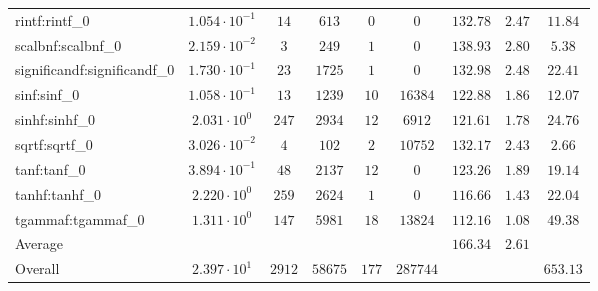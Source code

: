 \begin{tabular}{|l|c|c|c|c|c|c|c|c|}
rintf:rintf\_0               & $ 1.054 \cdot 10^{-1} $ & $ 14     $ & $ 613   $ & $ 0   $ & $ 0      $ & $ 132.78      $ & $ 2.47    $ & $ 11.84   $ \\
scalbnf:scalbnf\_0           & $ 2.159 \cdot 10^{-2} $ & $ 3      $ & $ 249   $ & $ 1   $ & $ 0      $ & $ 138.93      $ & $ 2.80    $ & $ 5.38    $ \\
significandf:significandf\_0 & $ 1.730 \cdot 10^{-1} $ & $ 23     $ & $ 1725  $ & $ 1   $ & $ 0      $ & $ 132.98      $ & $ 2.48    $ & $ 22.41   $ \\
sinf:sinf\_0                 & $ 1.058 \cdot 10^{-1} $ & $ 13     $ & $ 1239  $ & $ 10  $ & $ 16384  $ & $ 122.88      $ & $ 1.86    $ & $ 12.07   $ \\
sinhf:sinhf\_0               & $ 2.031 \cdot 10^{0}  $ & $ 247    $ & $ 2934  $ & $ 12  $ & $ 6912   $ & $ 121.61      $ & $ 1.78    $ & $ 24.76   $ \\
sqrtf:sqrtf\_0               & $ 3.026 \cdot 10^{-2} $ & $ 4      $ & $ 102   $ & $ 2   $ & $ 10752  $ & $ 132.17      $ & $ 2.43    $ & $ 2.66    $ \\
tanf:tanf\_0                 & $ 3.894 \cdot 10^{-1} $ & $ 48     $ & $ 2137  $ & $ 12  $ & $ 0      $ & $ 123.26      $ & $ 1.89    $ & $ 19.14   $ \\
tanhf:tanhf\_0               & $ 2.220 \cdot 10^{0}  $ & $ 259    $ & $ 2624  $ & $ 1   $ & $ 0      $ & $ 116.66      $ & $ 1.43    $ & $ 22.04   $ \\
tgammaf:tgammaf\_0           & $ 1.311 \cdot 10^{0}  $ & $ 147    $ & $ 5981  $ & $ 18  $ & $ 13824  $ & $ 112.16      $ & $ 1.08    $ & $ 49.38   $ \\
\hline
Average                      & $                     $ & $        $ & $       $ & $     $ & $        $ & $ 166.34      $ & $ 2.61    $ & $         $ \\
\hline
Overall                      & $ 2.397 \cdot 10^{1}  $ & $ 2912   $ & $ 58675 $ & $ 177 $ & $ 287744 $ & $             $ & $         $ & $ 653.13  $ \\
\hline
\end{tabular}
